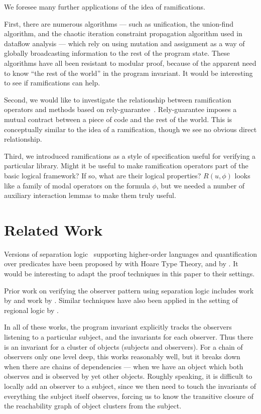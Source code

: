 \documentclass[natbib]{sigplanconf}
\begin{document}
We foresee many further applications of the idea of ramifications.

First, there are numerous algorithms --- such as unification, the
union-find algorithm, and the chaotic iteration constraint propagation
algorithm used in dataflow analysis --- which rely on using mutation
and assignment as a way of globally broadcasting information to the
rest of the program state. These algorithms have all been resistant to
modular proof, because of the apparent need to know ``the rest of the
world'' in the program invariant. It would be interesting to see if
ramifications can help.

Second, we would like to investigate the relationship between
ramification operators and methods based on
rely-guarantee~\cite{rely-guarantee-jones}. Rely-guarantee imposes a
mutual contract between a piece of code and the rest of the world.
This is conceptually similar to the idea of a ramification, though we
see no obvious direct relationship.

Third, we introduced ramifications as a style of
specification useful for verifying a particular library. Might it be
 useful to make ramification operators part of the basic
logical framework? If so, what are their logical properties? $R(u,
\phi)$ looks like a family of modal operators on the formula $\phi$, but
we needed a number of auxiliary interaction
lemmas to make them truly useful.

\section{Related Work}

Versions of separation logic~\cite{sep-logic} supporting higher-order
languages and quantification over predicates have been proposed by
\citet{htt} with Hoare Type Theory, and by
\citet{parkinson-bierman}. It would be interesting to adapt the
proof techniques in this paper to their settings.

Prior work on verifying the observer pattern using separation logic
includes work by \citet{tldi09,ftfjp07} and work by
\citet{parkinson-iwaco-07}. Similar techniques have also been applied
in the setting of regional logic by \citet{banerjee-naumann-regions}.

In all of these works, the program invariant explicitly tracks the
observers listening to a particular subject, and the invariants for
each observer. Thus there is an invariant for a cluster of objects
(subjects and observers). For a chain of observers only one level
deep, this works reasonably well, but it breaks down when there are
chains of dependencies --- when we have an object which both observes
and is observed by yet other objects. Roughly speaking, it is
difficult to locally add an observer to a subject, since we then need
to touch the invariants of everything the subject itself observes,
forcing us to know the transitive closure of the reachability graph of
object clusters from the subject. 
\end{document}
